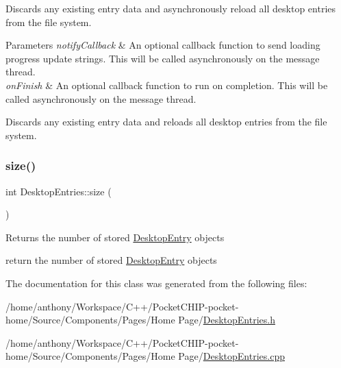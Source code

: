 Discards any existing entry data and asynchronously reload all desktop entries from the file system.


\begin{DoxyParams}{Parameters}
{\em notify\+Callback} & An optional callback function to send loading progress update strings. This will be called asynchronously on the message thread.\\
\hline
{\em on\+Finish} & An optional callback function to run on completion. This will be called asynchronously on the message thread.\\
\hline
\end{DoxyParams}
Discards any existing entry data and reloads all desktop entries from the file system. \mbox{\label{classDesktopEntries_a03a12d03f4b47e7bff920df1a29e7afe}} 
\subsubsection{\texorpdfstring{size()}{size()}}
{\footnotesize\ttfamily int Desktop\+Entries\+::size (\begin{DoxyParamCaption}{ }\end{DoxyParamCaption})}

\begin{DoxyReturn}{Returns}
the number of stored \mbox{\hyperlink{classDesktopEntry}{Desktop\+Entry}} objects
\end{DoxyReturn}
return the number of stored \mbox{\hyperlink{classDesktopEntry}{Desktop\+Entry}} objects 

The documentation for this class was generated from the following files\+:\begin{DoxyCompactItemize}
\item 
/home/anthony/\+Workspace/\+C++/\+Pocket\+C\+H\+I\+P-\/pocket-\/home/\+Source/\+Components/\+Pages/\+Home Page/\mbox{\hyperlink{DesktopEntries_8h}{Desktop\+Entries.\+h}}\item 
/home/anthony/\+Workspace/\+C++/\+Pocket\+C\+H\+I\+P-\/pocket-\/home/\+Source/\+Components/\+Pages/\+Home Page/\mbox{\hyperlink{DesktopEntries_8cpp}{Desktop\+Entries.\+cpp}}\end{DoxyCompactItemize}
